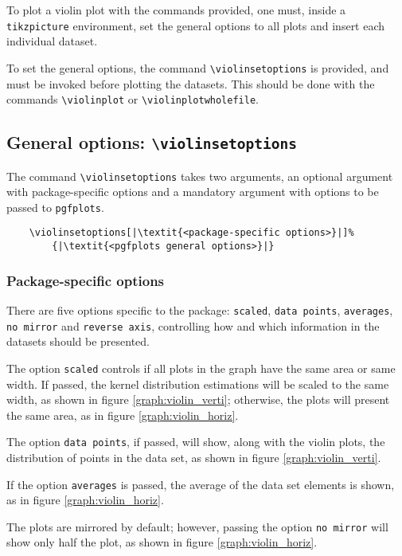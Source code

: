 \documentclass{article}
\begin{document}
To plot a violin plot with the commands provided, one must, inside
a \texttt{tikzpicture} environment, set the general options to all
plots and insert each individual dataset.

To set the general options, the command \texttt{{\textbackslash}violinsetoptions}
is provided, and must be invoked before plotting the datasets. This should
be done with the commands \texttt{{\textbackslash}violinplot} or
\texttt{{\textbackslash}violinplotwholefile}.

\subsection{General options: \texttt{{\textbackslash}violinsetoptions}}

The command \texttt{{\textbackslash}violinsetoptions} takes two arguments,
an optional argument with package-specific options and a mandatory
argument with options to be passed to \texttt{pgfplots}.

\begin{verbatim}
	\violinsetoptions[|\textit{<package-specific options>}|]%
		{|\textit{<pgfplots general options>}|}
\end{verbatim}

\subsubsection{Package-specific options}

There are five options specific to the package: \texttt{scaled},
\texttt{data points}, \texttt{averages}, \texttt{no mirror} and
\texttt{reverse axis}, controlling how and which information
in the datasets should be presented.

The option \texttt{scaled} controls if all plots in the graph
have the same area or same width. If passed, the kernel
distribution estimations will be scaled to the same width, as
shown in figure \ref{graph:violin_verti}; otherwise, the plots
will present the same area, as in figure \ref{graph:violin_horiz}.

The option \texttt{data points}, if passed, will show, along with
the violin plots, the distribution of points in the data set, as shown in
figure \ref{graph:violin_verti}.

If the option \texttt{averages} is passed, the average of the data set
elements is shown, as in figure \ref{graph:violin_horiz}.

The plots are mirrored by default; however, passing the option \texttt{no mirror}
will show only half the plot, as shown in figure \ref{graph:violin_horiz}.
\end{document}

